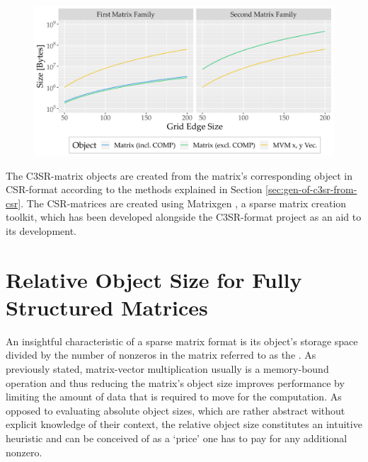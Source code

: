     \begin{figure}[H]
        \centering
        \captionsetup{width=0.9\columnwidth}
        \includegraphics[width=0.9\columnwidth]{assets/test-matrices-object-size.png} %
        \label{fig:test-matrices-object-size}
    \end{figure}

    The C3SR-matrix objects are created from the matrix's corresponding object in CSR-format according to the methods
    explained in Section \ref{sec:gen-of-c3sr-from-csr}. The CSR-matrices are created using Matrixgen
    \cite{matrixgen:github}, a sparse matrix creation toolkit, which has been developed alongside the C3SR-format
    project as an aid to its development.

  \section{Relative Object Size for Fully Structured Matrices} \label{sec:rel-object-size-fully-structured}

    An insightful characteristic of a sparse matrix format is its object's storage space divided by the number of
    nonzeros in the matrix referred to as the . As previously stated, matrix-vector
    multiplication usually is a memory-bound operation and thus reducing the matrix's object size improves performance
    by limiting the amount of data that is required to move for the computation. As opposed to evaluating absolute
    object sizes, which are rather abstract without explicit knowledge of their context, the relative object size
    constitutes an intuitive heuristic and can be conceived of as a `price' one has to pay for any additional nonzero.


